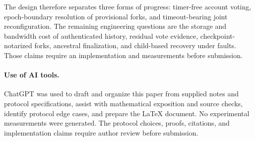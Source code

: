 \documentclass[10pt,twocolumn]{article}
\begin{document}
The design therefore separates three forms of progress: timer-free account voting, epoch-boundary resolution of provisional forks, and timeout-bearing joint reconfiguration. The remaining engineering questions are the storage and bandwidth cost of authenticated history, residual vote evidence, checkpoint-notarized forks, ancestral finalization, and child-based recovery under faults. Those claims require an implementation and measurements before submission.

\paragraph{Use of AI tools.} ChatGPT was used to draft and organize this paper from supplied notes and protocol specifications, assist with mathematical exposition and source checks, identify protocol edge cases, and prepare the LaTeX document. No experimental measurements were generated. The protocol choices, proofs, citations, and implementation claims require author review before submission.

\begin{center}
\end{center}
\end{document}
